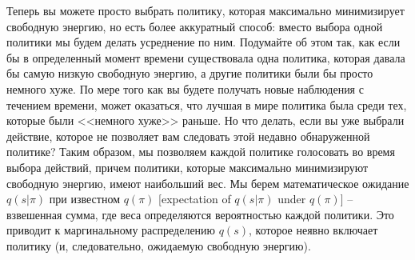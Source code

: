 \documentclass[twoside,leqno, 11pt]{article}
\begin{document}
	\begin{figure}[h]
	\end{figure}
	
	
	Теперь вы можете просто выбрать политику, которая максимально минимизирует свободную энергию, но есть более аккуратный способ: вместо выбора одной политики мы будем делать усреднение по ним. Подумайте об этом так, как если бы в определенный момент времени существовала одна политика, которая давала бы самую низкую свободную энергию, а другие политики были бы просто немного хуже. По мере того как вы будете получать новые наблюдения с течением времени, может оказаться, что лучшая в мире политика была среди тех, которые были <<немного хуже>> раньше. Но что делать, если вы уже выбрали действие, которое не позволяет вам следовать этой недавно обнаруженной политике? Таким образом, мы позволяем каждой политике голосовать во время выбора действий, причем политики, которые максимально минимизируют свободную энергию, имеют наибольший вес. Мы берем математическое ожидание $q(s|\pi)$ при известном $q(\pi)$ [expectation of $q(s|\pi)$ under $q(\pi)$] -- взвешенная сумма, где веса определяются вероятностью каждой политики. Это приводит к маргинальному распределению $q(s)$, которое неявно включает политику (и, следовательно, ожидаемую свободную энергию).
	
\end{document}
